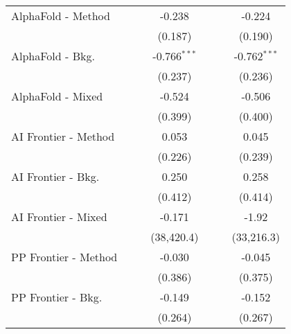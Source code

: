 \begin{tabular}{lcccccc}
   AlphaFold - Method           &                &               & -0.238         &                &              & -0.224\\   
                                &                &               & (0.187)        &                &              & (0.190)\\   
   AlphaFold - Bkg.             &                &               & -0.766$^{***}$ &                &              & -0.762$^{***}$\\   
                                &                &               & (0.237)        &                &              & (0.236)\\   
   AlphaFold - Mixed            &                &               & -0.524         &                &              & -0.506\\   
                                &                &               & (0.399)        &                &              & (0.400)\\   
   AI Frontier - Method         &                &               & 0.053          &                &              & 0.045\\   
                                &                &               & (0.226)        &                &              & (0.239)\\   
   AI Frontier - Bkg.           &                &               & 0.250          &                &              & 0.258\\   
                                &                &               & (0.412)        &                &              & (0.414)\\   
   AI Frontier - Mixed          &                &               & -0.171         &                &              & -1.92\\   
                                &                &               & (38,420.4)     &                &              & (33,216.3)\\   
   PP Frontier - Method         &                &               & -0.030         &                &              & -0.045\\   
                                &                &               & (0.386)        &                &              & (0.375)\\   
   PP Frontier - Bkg.           &                &               & -0.149         &                &              & -0.152\\   
                                &                &               & (0.264)        &                &              & (0.267)\\   

\end{tabular}

